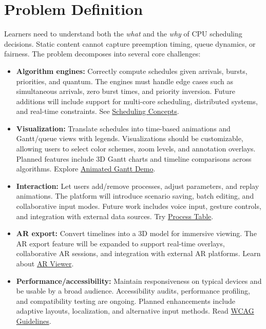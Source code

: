 \documentclass[12pt,a4paper,oneside]{report}
\begin{document}
\section{Problem Definition}
Learners need to understand both the \emph{what} and the \emph{why} of CPU scheduling decisions. Static content cannot capture preemption timing, queue dynamics, or fairness. The problem decomposes into several core challenges:
\begin{itemize}
  \item \textbf{Algorithm engines:} Correctly compute schedules given arrivals, bursts, priorities, and quantum. The engines must handle edge cases such as simultaneous arrivals, zero burst times, and priority inversion. Future additions will include support for multi-core scheduling, distributed systems, and real-time constraints. See \href{https://en.wikipedia.org/wiki/Scheduling_(computing)}{Scheduling Concepts}.
  \item \textbf{Visualization:} Translate schedules into time-based animations and Gantt/queue views with legends. Visualizations should be customizable, allowing users to select color schemes, zoom levels, and annotation overlays. Planned features include 3D Gantt charts and timeline comparisons across algorithms. Explore \href{https://osverse.shreyjain.me/animated-gantt}{Animated Gantt Demo}.
  \item \textbf{Interaction:} Let users add/remove processes, adjust parameters, and replay animations. The platform will introduce scenario saving, batch editing, and collaborative input modes. Future work includes voice input, gesture controls, and integration with external data sources. Try \href{https://osverse.shreyjain.me/process-table}{Process Table}.
  \item \textbf{AR export:} Convert timelines into a 3D model for immersive viewing. The AR export feature will be expanded to support real-time overlays, collaborative AR sessions, and integration with external AR platforms. Learn about \href{https://osverse.shreyjain.me/ar-viewer}{AR Viewer}.
  \item \textbf{Performance/accessibility:} Maintain responsiveness on typical devices and be usable by a broad audience. Accessibility audits, performance profiling, and compatibility testing are ongoing. Planned enhancements include adaptive layouts, localization, and alternative input methods. Read \href{https://www.w3.org/WAI/standards-guidelines/wcag/}{WCAG Guidelines}.
\end{itemize}
\end{document}
